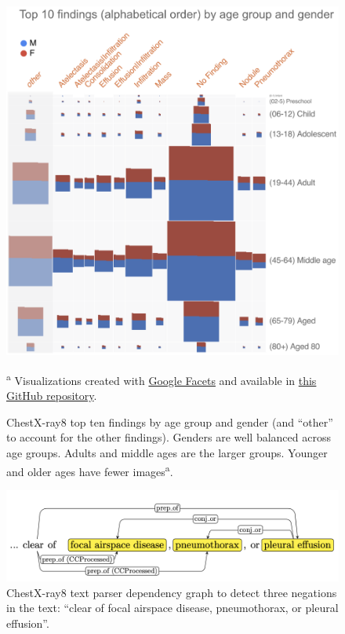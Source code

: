 \documentclass{article}
\begin{document}
\begin{figure}[!htb]
    \centering
    \includegraphics[width=0.8\columnwidth]{figures/chestX-ray8-findings-age-group-gender.png}
    \caption[ChestX-ray top ten findings by age group and gender.]{ChestX-ray8 top ten findings by age group and gender (and ``other'' to account for the other findings). Genders are well balanced across age groups. Adults and middle ages are the larger groups. Younger and older ages have fewer images\textsuperscript{a}.}
    \scriptsize\textsuperscript{a} Visualizations created with \href{https://pair-code.github.io/facets/}{Google Facets} and available in \href{https://github.com/fau-masters-collected-works-cgarbin/dataset-visualization-faces-streamlit}{this GitHub repository}.    \label{fig:chestX-ray8-findings-age-group-gender}
\end{figure}

\begin{figure}[!htb]
    \centering
    \includegraphics[width=0.8\columnwidth]{figures/chestX-ray8-figure-3.png}
    \caption[ChestX-ray8 text parser negation detection example.]{ChestX-ray8 text parser dependency graph to detect three negations in the text: “clear of focal airspace disease, pneumothorax, or pleural effusion”. \cite{Wang2017}}
    \label{fig:chestX-ray8-figure-3}
\end{figure}
\end{document}
